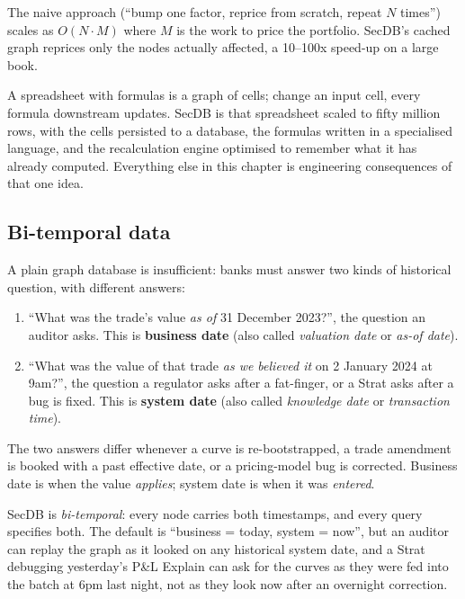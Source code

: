 The naive approach (``bump one factor, reprice from scratch,
repeat $N$ times'') scales as $O(N \cdot M)$ where $M$ is the
work to price the portfolio.  SecDB's cached graph reprices only
the nodes actually affected, a 10--100x speed-up on a large book.

\begin{intuitionbox}
A spreadsheet with formulas is a graph of cells; change an input
cell, every formula downstream updates.  SecDB is that spreadsheet
scaled to fifty million rows, with the cells persisted to a
database, the formulas written in a specialised language, and the
recalculation engine optimised to remember what it has already
computed.  Everything else in this chapter is engineering
consequences of that one idea.
\end{intuitionbox}

\subsection{Bi-temporal data}
\label{sec:bitemporal}

A plain graph database is insufficient: banks must answer two
kinds of historical question, with different answers:
\begin{enumerate}
  \item ``What was the trade's value \emph{as of} 31 December
    2023?'', the question an auditor asks.  This is
    \textbf{business date} (also called \emph{valuation date} or
    \emph{as-of date}).
  \item ``What was the value of that trade \emph{as we believed
    it} on 2 January 2024 at 9am?'', the question a regulator
    asks after a fat-finger, or a Strat asks after a bug is fixed.
    This is \textbf{system date} (also called \emph{knowledge date}
    or \emph{transaction time}).
\end{enumerate}
The two answers differ whenever a curve is re-bootstrapped, a
trade amendment is booked with a past effective date, or a
pricing-model bug is corrected.  Business date is when the value
\emph{applies}; system date is when it was \emph{entered}.

SecDB is \emph{bi-temporal}: every node carries both timestamps,
and every query specifies both.  The default is ``business =
today, system = now'', but an auditor can replay the graph as it
looked on any historical system date, and a Strat debugging
yesterday's P\&L Explain can ask for the curves as they were fed
into the batch at 6pm last night, not as they look now after an
overnight correction.

